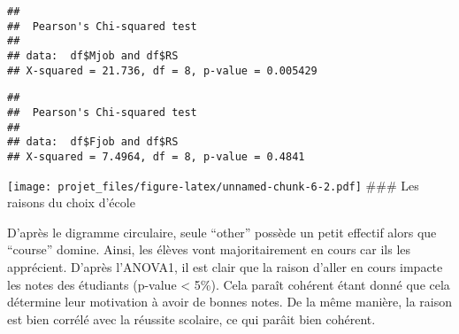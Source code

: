 \documentclass[
]{article}
\newenvironment{Shaded}{\begin{snugshade}}{\end{snugshade}}
\newcommand{\CommentTok}[1]{\textcolor[rgb]{0.56,0.35,0.01}{\textit{#1}}}
\newcommand{\FunctionTok}[1]{\textcolor[rgb]{0.00,0.00,0.00}{#1}}
\newcommand{\NormalTok}[1]{#1}
\newcommand{\OtherTok}[1]{\textcolor[rgb]{0.56,0.35,0.01}{#1}}
\newcommand{\SpecialCharTok}[1]{\textcolor[rgb]{0.00,0.00,0.00}{#1}}
\begin{document}
\begin{Shaded}
\end{Shaded}

\begin{verbatim}
## 
##  Pearson's Chi-squared test
## 
## data:  df$Mjob and df$RS
## X-squared = 21.736, df = 8, p-value = 0.005429
\end{verbatim}

\begin{Shaded}
\end{Shaded}

\begin{verbatim}
## 
##  Pearson's Chi-squared test
## 
## data:  df$Fjob and df$RS
## X-squared = 7.4964, df = 8, p-value = 0.4841
\end{verbatim}

\begin{Shaded}
\end{Shaded}

\texttt{[image: projet\_files/figure-latex/unnamed-chunk-6-2.pdf]} \#\#\#
Les raisons du choix d'école

D'après le digramme circulaire, seule ``other'' possède un petit
effectif alors que ``course'' domine. Ainsi, les élèves vont
majoritairement en cours car ils les apprécient. D'après l'ANOVA1, il
est clair que la raison d'aller en cours impacte les notes des étudiants
(p-value \textless{} 5\%). Cela paraît cohérent étant donné que cela
détermine leur motivation à avoir de bonnes notes. De la même manière,
la raison est bien corrélé avec la réussite scolaire, ce qui parâit bien
cohérent.
\end{document}
